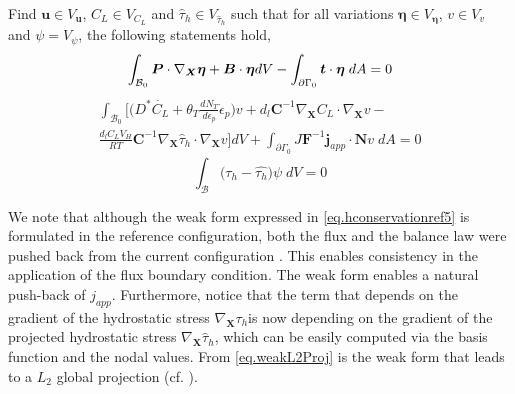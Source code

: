 \documentclass[10pt]{elsarticle}
\newcommand{\mbs}[1]{\boldsymbol{#1}}
\def\bs{{\mbs{s}}} \def\bt{{\mbs{t}}} \def\bu{{\mbs{u}}}
\def\beeta{{\mbs{\eta}}}
\def\bs{\boldsymbol}
\newcommand{\tensor}[1]{\ensuremath{\boldsymbol{#1}}}
\begin{document}
Find $\bu \in V_{\bu}$, $C_{L} \in V_{C_{L}}$ and $\hat{\tau}_{h} \in V_{\hat{\tau}_{h}}$ such that for all variations
 $\beeta \in V_{\beeta}$, $v \in V_{v}$ and $\psi = V_{\psi}$, the following statements hold,      
\begin{equation}
\label{eq.weakBalanceLinearMomentum}
\int_{\mathcal{B}_{0}}   \tensor{P}  \cdot \nabla_{\bs{X}}  \beeta + \bB  \cdot \beeta dV  - \int_{\partial \Gamma_{0}}   \bt  \cdot \beeta \; dA = 0
\end{equation}    
\begin{align}
\label{eq.hconservationref5_1} \int_{\mathcal{B}_{0}} \bigg[ \big( D^{*}\dot{C_{L}} +  \theta_{T} \frac{d N_{T}}{d \epsilon_{p}} \dot{\epsilon}_{p} \big)v  +   d_{l} \bs{C}^{-1}  \nabla_{\bs{X}} C_{L}  \cdot  \nabla_{\bs{X}}v  - \nonumber \\ \frac{d_{l} C_{L}V_{H}}{RT} \bs{C}^{-1} \nabla_{\bs{X}} \hat{\tau}_{h}  \cdot \nabla_{\bs{X}}v \bigg] dV + \int_{\partial \Gamma_{0}} J\bs{F}^{-1}\bs{j}_{app} \cdot \bs{N}v \; dA = 0
\end{align}
\begin{equation}
\label{eq.weakL2Proj} \int_{\mathcal{B}} \Big( \tau_{h} - \hat{\tau_{h}} \Big) \psi \; dV = 0
\end{equation}

We note that although the weak form expressed in \eqref{eq.hconservationref5} is formulated in the reference configuration, both the flux and the balance law were pushed back from the current configuration . This enables consistency in the application of the flux boundary condition. The weak form enables a natural push-back of $j_{app}$. Furthermore, notice that the term that depends 
on the gradient of the hydrostatic stress $\nabla_{\bs{X}} \tau_{h}$is now depending on the gradient of the  projected hydrostatic stress $\nabla_{\bs{X}} \hat{\tau}_{h}$, which can be easily computed via the basis function and the nodal values. 
From \eqref{eq.weakL2Proj} is the weak form that leads to a $L_{2}$ global projection (cf. \citep{Mota:2013}).
\end{document}
